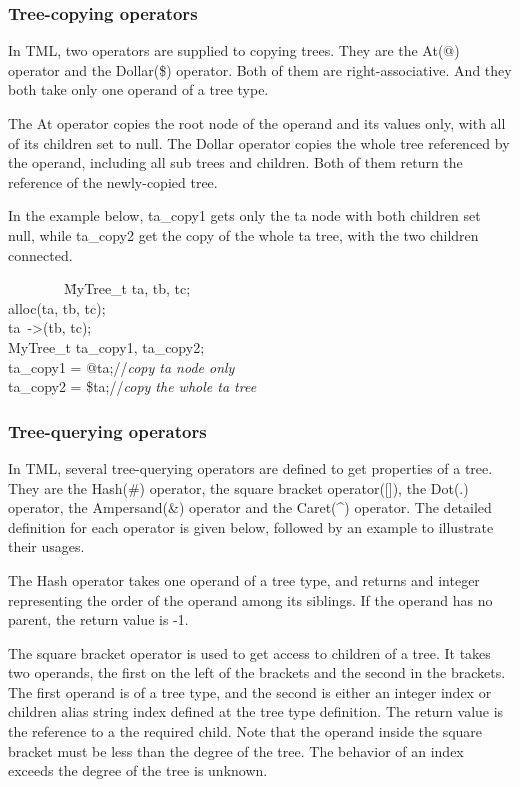 \documentclass[12pt,psfig,a4]{article}
\begin{document}
\subsubsection{Tree-copying operators}
In TML, two operators are supplied to copying trees. They are the At(@) operator and the Dollar(\$) operator. Both of them are right-associative. And they both take only one operand of a tree type. 

The At operator copies the root node of the operand and its values only, with all of its children set to null. The Dollar operator copies the whole tree referenced by the operand, including all sub trees and children. Both of them return the reference of the newly-copied tree.

In the example below, ta\_copy1 gets only the ta node with both children set null, while ta\_copy2 get the copy of the whole ta tree, with the two children connected.
\begin{code}
\begin{tabbing}
~~~~~~~~\= MyTree\_t ta, tb, tc;~~~~~~~\=\\
\> alloc(ta, tb, tc);\\
\> ta~-\textgreater(tb, tc);\\
\> MyTree\_t ta\_copy1, ta\_copy2;\\
\> ta\_copy1 = @ta;\>//\textit{copy ta node only}\\
\> ta\_copy2 = \$ta;\>//\textit{copy the whole ta tree }
\end{tabbing}
\end{code}


\subsubsection{Tree-querying operators}
\label{treeOp}
In TML, several tree-querying operators are defined to get properties of a tree. They are the Hash(\#) operator, the square bracket operator([]), the Dot(.) operator, the Ampersand(\&) operator and the Caret(\^{}) operator. The detailed definition for each operator is given below, followed by an example to illustrate their usages.

The Hash operator takes one operand of a tree type, and returns and integer representing the order of the operand among its siblings. If the operand has no parent, the return value is -1. 

The square bracket operator is used to get access to children of a tree. It takes two operands, the first on the left of the brackets and the second in the brackets. The first operand is of a tree type, and the second is either an integer index or children alias string index defined at the tree type definition. The return value is the reference to a the required child. Note that the operand inside the square bracket must be less than the degree of the tree. The behavior of an index exceeds the degree of the tree is unknown.
\end{document}
